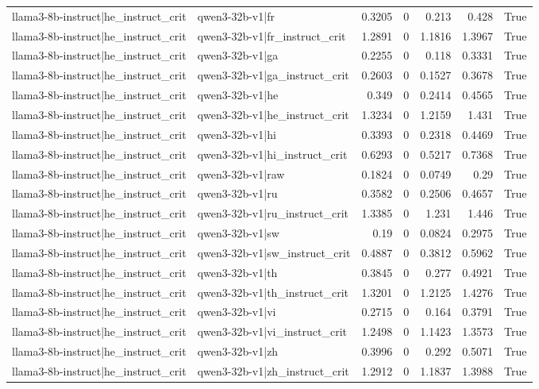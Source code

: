 \begin{table}
\begin{tabular}{l l r r r r l}
llama3-8b-instruct|he_instruct_crit & qwen3-32b-v1|fr & 0.3205 & 0 & 0.213 & 0.428 & True \\
llama3-8b-instruct|he_instruct_crit & qwen3-32b-v1|fr_instruct_crit & 1.2891 & 0 & 1.1816 & 1.3967 & True \\
llama3-8b-instruct|he_instruct_crit & qwen3-32b-v1|ga & 0.2255 & 0 & 0.118 & 0.3331 & True \\
llama3-8b-instruct|he_instruct_crit & qwen3-32b-v1|ga_instruct_crit & 0.2603 & 0 & 0.1527 & 0.3678 & True \\
llama3-8b-instruct|he_instruct_crit & qwen3-32b-v1|he & 0.349 & 0 & 0.2414 & 0.4565 & True \\
llama3-8b-instruct|he_instruct_crit & qwen3-32b-v1|he_instruct_crit & 1.3234 & 0 & 1.2159 & 1.431 & True \\
llama3-8b-instruct|he_instruct_crit & qwen3-32b-v1|hi & 0.3393 & 0 & 0.2318 & 0.4469 & True \\
llama3-8b-instruct|he_instruct_crit & qwen3-32b-v1|hi_instruct_crit & 0.6293 & 0 & 0.5217 & 0.7368 & True \\
llama3-8b-instruct|he_instruct_crit & qwen3-32b-v1|raw & 0.1824 & 0 & 0.0749 & 0.29 & True \\
llama3-8b-instruct|he_instruct_crit & qwen3-32b-v1|ru & 0.3582 & 0 & 0.2506 & 0.4657 & True \\
llama3-8b-instruct|he_instruct_crit & qwen3-32b-v1|ru_instruct_crit & 1.3385 & 0 & 1.231 & 1.446 & True \\
llama3-8b-instruct|he_instruct_crit & qwen3-32b-v1|sw & 0.19 & 0 & 0.0824 & 0.2975 & True \\
llama3-8b-instruct|he_instruct_crit & qwen3-32b-v1|sw_instruct_crit & 0.4887 & 0 & 0.3812 & 0.5962 & True \\
llama3-8b-instruct|he_instruct_crit & qwen3-32b-v1|th & 0.3845 & 0 & 0.277 & 0.4921 & True \\
llama3-8b-instruct|he_instruct_crit & qwen3-32b-v1|th_instruct_crit & 1.3201 & 0 & 1.2125 & 1.4276 & True \\
llama3-8b-instruct|he_instruct_crit & qwen3-32b-v1|vi & 0.2715 & 0 & 0.164 & 0.3791 & True \\
llama3-8b-instruct|he_instruct_crit & qwen3-32b-v1|vi_instruct_crit & 1.2498 & 0 & 1.1423 & 1.3573 & True \\
llama3-8b-instruct|he_instruct_crit & qwen3-32b-v1|zh & 0.3996 & 0 & 0.292 & 0.5071 & True \\
llama3-8b-instruct|he_instruct_crit & qwen3-32b-v1|zh_instruct_crit & 1.2912 & 0 & 1.1837 & 1.3988 & True \\

\end{tabular}
\end{table}

